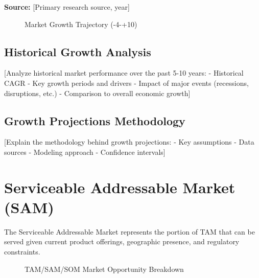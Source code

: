 \documentclass[11pt,letterpaper]{report}
\newcommand{\baseyear}{0}
\newcommand{\histstart}{\the\numexpr\baseyear-4\relax}   %
\newcommand{\horizonyear}{\the\numexpr\baseyear+10\relax}    %
\begin{document}
\textbf{Source:} [Primary research source, year]

\begin{figure}[htbp]
\centering
\caption{Market Growth Trajectory (\histstart{}-\horizonyear{})}
\label{fig:market_growth}
\end{figure}

\subsection{Historical Growth Analysis}

[Analyze historical market performance over the past 5-10 years:
- Historical CAGR
- Key growth periods and drivers
- Impact of major events (recessions, disruptions, etc.)
- Comparison to overall economic growth]

\subsection{Growth Projections Methodology}

[Explain the methodology behind growth projections:
- Key assumptions
- Data sources
- Modeling approach
- Confidence intervals]

\section{Serviceable Addressable Market (SAM)}

The Serviceable Addressable Market represents the portion of TAM that can be served given current product offerings, geographic presence, and regulatory constraints.


\begin{figure}[htbp]
\centering
\caption{TAM/SAM/SOM Market Opportunity Breakdown}
\label{fig:tam_sam_som}
\end{figure}
\end{document}
